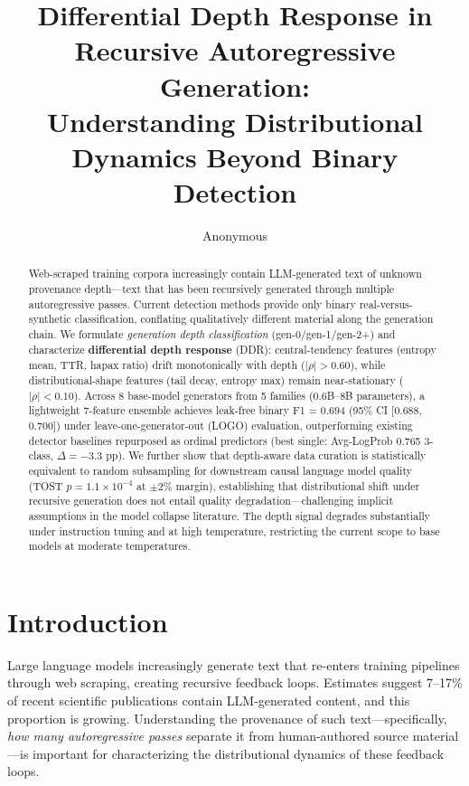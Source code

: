\documentclass[11pt,a4paper]{article}
\title{Differential Depth Response in Recursive Autoregressive Generation:\\Understanding Distributional Dynamics Beyond Binary Detection}
\author{Anonymous}
\date{}
\begin{document}
\maketitle

\begin{abstract}
Web-scraped training corpora increasingly contain LLM-generated text of unknown provenance depth---text that has been recursively generated through multiple autoregressive passes. Current detection methods provide only binary real-versus-synthetic classification, conflating qualitatively different material along the generation chain. We formulate \emph{generation depth classification} (gen-0/gen-1/gen-2+) and characterize \textbf{differential depth response} (DDR): central-tendency features (entropy mean, TTR, hapax ratio) drift monotonically with depth ($|\rho| > 0.60$), while distributional-shape features (tail decay, entropy max) remain near-stationary ($|\rho| < 0.10$). Across 8 base-model generators from 5 families (0.6B--8B parameters), a lightweight 7-feature ensemble achieves leak-free binary F1 = 0.694 (95\% CI [0.688, 0.700]) under leave-one-generator-out (LOGO) evaluation, outperforming existing detector baselines repurposed as ordinal predictors (best single: Avg-LogProb 0.765 3-class, $\Delta = -3.3$ pp). We further show that depth-aware data curation is statistically equivalent to random subsampling for downstream causal language model quality (TOST $p = 1.1 \times 10^{-4}$ at $\pm$2\% margin), establishing that distributional shift under recursive generation does not entail quality degradation---challenging implicit assumptions in the model collapse literature. The depth signal degrades substantially under instruction tuning and at high temperature, restricting the current scope to base models at moderate temperatures.
\end{abstract}

\section{Introduction}

Large language models increasingly generate text that re-enters training pipelines through web scraping, creating recursive feedback loops. Estimates suggest 7--17\% of recent scientific publications contain LLM-generated content, and this proportion is growing. Understanding the provenance of such text---specifically, \emph{how many autoregressive passes} separate it from human-authored source material---is important for characterizing the distributional dynamics of these feedback loops.
\end{document}
